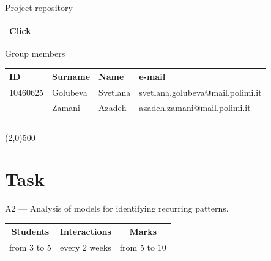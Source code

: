 \documentclass[a4paper,12pt,titlepage,fullpage]{article} %
\begin{document}
\begin{titlepage}
\vspace{20pt}

\begin{center}
	{\large Project repository}
\end{center}
\begin{tabularx}{\textwidth}{|X|}
	\hline
	\href{https://github.com/attillax/ASE-2015}{Click}\\
	\hline
\end{tabularx}

\vspace{20pt}

\begin{center}
	{\large Group members}
\end{center}
\begin{tabularx}{\textwidth}{|l|l|l|X|}
	\hline
	ID & Surname & Name & e-mail \\
	\hline
	10460625 & Golubeva & Svetlana & svetlana.golubeva@mail.polimi.it \\
	\hline
	 & Zamani & Azadeh & azadeh.zamani@mail.polimi.it \\
	\hline
	 &  & & \\
	\hline
	 &  & & \\
	\hline
\end{tabularx}

\vspace{\fill}
\begin{center}
	\line(2,0){500}
\end{center}

\end{titlepage}

\tableofcontents

\newpage
\listoftables

\listoffigures

\newpage
\section{Task} 

A2 --- Analysis of models for identifying recurring patterns.\\

\begin{tabular}{|c|c|c|}
	\hline
	Students & Interactions & Marks \\
	\hline
	from 3 to 5 & every 2 weeks & from 5 to 10 \\
	\hline
\end{tabular}
\end{document}
